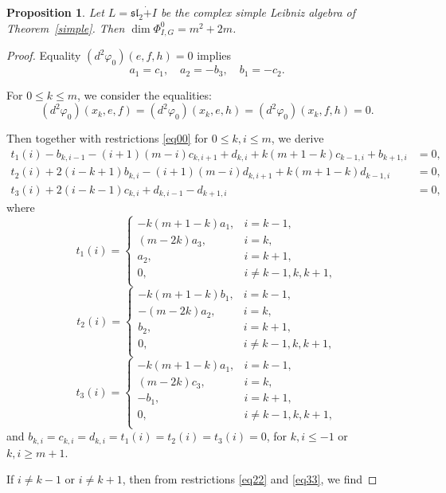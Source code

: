 \documentclass[12pt,reqno]{amsart}
\newtheorem{prop}[thm]{Proposition}
\numberwithin{equation}{section}
\begin{document}
\begin{prop}  Let $L= \mathfrak{sl}_2\dot{+}I$ be the complex simple Leibniz algebra of Theorem~\ref{simple}.
Then $\dim\Phi_{I,G}^{0}=m^2+2m$.
\end{prop}
\begin{proof} Equality $(d^2\varphi_{0})(e, f, h)=0$ implies
\begin{equation}\label{eq00} a_{1}=c_{1}, \quad a_{2}=-b_{3}, \quad b_{1}=-c_{2}.\end{equation}

For $0\leq k\leq m$, we consider  the equalities:
\[(d^2\varphi_{0})(x_k, e,
f)=(d^2\varphi_{0})(x_k, e, h)=(d^2\varphi_{0})(x_k, f, h)=0.\]

Then together with restrictions \eqref{eq00} for $0\leq k,i\leq m$, we derive
\begin{align}
t_1(i)-b_{k,i-1}-(i+1)(m-i)c_{k,i+1}+d_{k,i}+k(m+1-k)c_{k-1,i}+b_{k+1,i} & =0, \label{eq11} \\
t_2(i)+2(i-k+1)b_{k,i}-(i+1)(m-i)d_{k,i+1}+k(m+1-k)d_{k-1,i} &=0,  \label{eq22} \\
t_3(i)+2(i-k-1)c_{k,i}+d_{k,i-1}-d_{k+1,i} & =0, \label{eq33}
\end{align}
where
\[t_1(i)=\left\{\begin{array}{ll}
-k(m+1-k)a_{1},& i=k-1,\\[1mm]
(m-2k)a_{3},& i=k,\\[1mm]
a_{2},& i=k+1,\\[1mm]
0,& i\neq k-1,k,k+1,\\[1mm]
\end{array}\right.\]
\[ t_2(i)=\left\{\begin{array}{ll}
-k(m+1-k)b_{1},& i=k-1,\\[1mm]
-(m-2k)a_{2},& i=k,\\[1mm]
b_{2},& i=k+1,\\[1mm]
0,& i\neq k-1,k,k+1,\\[1mm]
\end{array}\right.\]
\[ t_3(i)=\left\{\begin{array}{ll}
-k(m+1-k)a_{1},& i=k-1,\\[1mm]
(m-2k)c_{3},& i=k,\\[1mm]
-b_{1},& i=k+1,\\[1mm]
0,& i\neq k-1,k,k+1,\\[1mm]
\end{array}\right.\]
and
$b_{k,i}=c_{k,i}=d_{k,i}=t_1(i)=t_2(i)=t_3(i)=0$,  for $k,i\leq -1$ or $k,i\geq m+1$.

If $i\neq k-1$ or $i\neq k+1$, then from restrictions \eqref{eq22} and \eqref{eq33}, we find


\end{proof}
\end{document}
